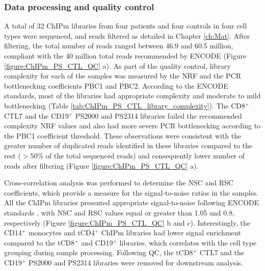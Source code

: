 \subsubsection{Data processing and quality control}

A total of 32 ChIPm libraries from four patients and four controls in four cell types were sequenced, and reads filtered as detailed in Chapter \ref{ch:Mat}. After filtering, the total number of reads ranged between 46.9 and 60.5 million, compliant with the 40 million total reads recommended by ENCODE (Figure \ref{figure:ChIPm_PS_CTL_QC} a). As part of the quality control, library complexity for each of the samples was measured by the NRF and the PCR bottlenecking coefficients PBC1 and PBC2. According to the ENCODE standards, most of the libraries had appropriate complexity and moderate to mild bottlenecking (Table \ref{tab:ChIPm_PS_CTL_library_complexity}). The CD8$^+$ CTL7 and the CD19$^+$ PS2000 and PS2314 libraries failed the recommended complexity NRF values and also had more severe PCR bottlenecking according to the PBC1 coefficient threshold. These observations were consistent with the greater number of duplicated reads identified in these libraries compared to the rest ($>$50\% of the total sequenced reads) and consequently lower number of reads after filtering (Figure \ref{figure:ChIPm_PS_CTL_QC} a).  

Cross-correlation analysis was performed to determine the NSC and RSC coefficients, which provide a measure for the signal-to-noise ratios in the samples. All the ChIPm libraries presented appropriate signal-to-noise following ENCODE standards \parencite{Landt2012}, with NSC and RSC values equal or greater than 1.05 and 0.8, respectively (Figure \ref{figure:ChIPm_PS_CTL_QC} b and c). Interestingly, the CD14$^+$ monocytes and tCD4$^+$ ChIPm libraries had lower signal enrichment compared to the tCD8$^+$ and CD19$^+$ libraries, which correlates with the cell type grouping during sample processing. Following QC, the tCD8$^+$ CTL7 and the CD19$^+$ PS2000 and PS2314 libraries were removed for downstream analysis.




